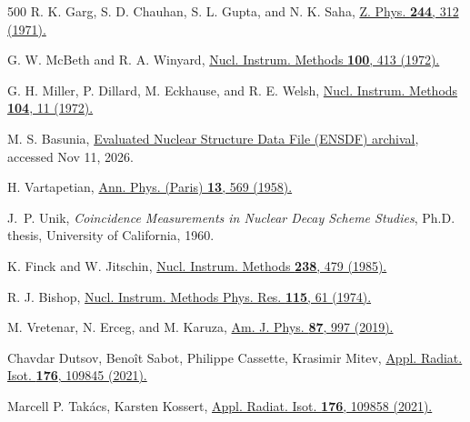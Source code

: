 \documentclass[aps,UTF8,prc,twocolumn,preprintnumbers,amsmath,amssymb,floatfix]{revtex4-2}
\begin{document}
\begin{thebibliography}{500}
R. K. Garg, S. D. Chauhan, S. L. Gupta, and N. K. Saha, \href{https://doi.org/10.1007/BF01396790}{Z. Phys. \textbf{244}, 312 (1971).}

G. W. McBeth and R. A. Winyard, \href{https://doi.org/10.1016/0029-554X(72)90815-4}{Nucl. Instrum. Methods \textbf{100}, 413 (1972).}

G. H. Miller, P. Dillard, M. Eckhause, and R. E. Welsh, \href{https://doi.org/10.1016/0029-554X(72)90290-X}{Nucl. Instrum. Methods \textbf{104}, 11 (1972).}

M. S. Basunia, \href{https://www.nndc.bnl.gov/ensdfarchivals/}{Evaluated Nuclear Structure Data File (ENSDF) archival}, accessed Nov 11, 2026.

H. Vartapetian, \href{https://doi.org/10.1051/anphys/195811030569}{Ann. Phys. (Paris) \textbf{13}, 569 (1958).}

J.~P. Unik, \textit{Coincidence Measurements in Nuclear Decay Scheme Studies}, Ph.D. thesis, University of California, 1960.

K. Finck and W. Jitschin, \href{https://doi.org/10.1016/0168-9002(85)90488-7}{Nucl. Instrum. Methods \textbf{238}, 479 (1985).}

R. J. Bishop, \href{https://doi.org/10.1016/0029-554X(74)90425-X}{Nucl. Instrum. Methods Phys. Res. \textbf{115}, 61 (1974).}



M. Vretenar, N. Erceg, and M. Karuza, \href{https://doi.org/10.1119/1.5122744}{Am. J. Phys. \textbf{87}, 997 (2019).}

Chavdar Dutsov, Beno\^{i}t Sabot, Philippe Cassette, Krasimir Mitev,
\href{https://doi.org/10.1016/j.apradiso.2021.109845}{Appl. Radiat. Isot. \textbf{176}, 109845 (2021).}

Marcell P. Tak\'acs, Karsten Kossert,
\href{https://doi.org/10.1016/j.apradiso.2021.109858}{Appl. Radiat. Isot. \textbf{176}, 109858 (2021).}


\end{thebibliography}
\end{document}

